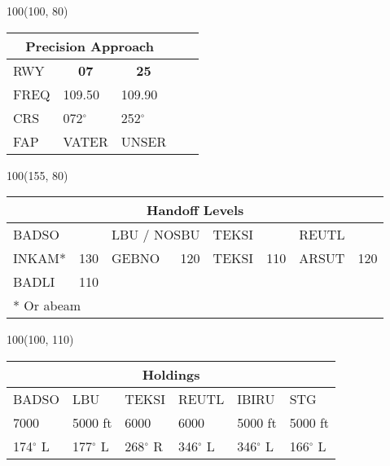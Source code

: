 \documentclass[10pt,landscape,a4paper]{article}
\begin{document}
\begin{textblock}{100}(100, 80)
\begin{table}[]
\begin{tabular}{lllll}
\multicolumn{3}{c}{\textbf{Precision Approach}} \\ \hline
\multicolumn{1}{|l|}{RWY} & \multicolumn{1}{c|}{\textbf{07}} & \multicolumn{1}{c|}{\textbf{25}}\\ \hline
\multicolumn{1}{|l|}{FREQ} & \multicolumn{1}{l|}{109.50} & \multicolumn{1}{l|}{109.90}\\
\multicolumn{1}{|l|}{CRS} & \multicolumn{1}{l|}{072$^\circ$} & \multicolumn{1}{l|}{252$^\circ$}\\
\multicolumn{1}{|l|}{FAP} & \multicolumn{1}{l|}{VATER} & \multicolumn{1}{l|}{UNSER} \\ \hline
\end{tabular}
\end{table}
\end{textblock}

\begin{textblock}{100}(155, 80)
\begin{table}[]
\begin{tabular}{|lr|lr|lr|lr|}
\multicolumn{8}{c}{\textbf{Handoff Levels}} \\ \hline
BADSO && \multicolumn{2}{l|}{LBU / NOSBU} & TEKSI && REUTL & \\ \hline
INKAM* & 130 & GEBNO & 120 & TEKSI & 110 & ARSUT & 120 \\
BADLI & 110 &&&&&& \\ \hline
\multicolumn{8}{l}{* Or abeam} \\
\end{tabular}
\end{table}
\end{textblock}

\begin{textblock}{100}(100, 110)
\begin{table}[]
\begin{tabular}{|l|l|l|l|l|l|}
\multicolumn{6}{c}{\textbf{Holdings}} \\ \hline
BADSO & LBU & TEKSI & REUTL & IBIRU & STG \\ \hline
7000 & 5000 ft & 6000 & 6000 & 5000 ft & 5000 ft \\
174$^\circ$ L & 177$^\circ$ L & 268$^\circ$ R & 346$^\circ$ L & 346$^\circ$ L & 166$^\circ$ L \\ \hline
\end{tabular}
\end{table}
\end{textblock}
\end{document}
